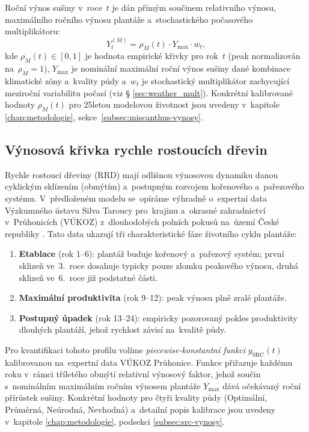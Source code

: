 Roční výnos sušiny v~roce~$t$ je dán přímým součinem relativního
výnosu, maximálního ročního výnosu plantáže a~stochastického
počasového multiplikátoru:
\begin{equation}
    Y_{t}^{(M)} = \rho_M(t) \cdot Y_{\max} \cdot w_t,
    \label{eq:miscanthus-vynos-empirie}
\end{equation}
kde $\rho_M(t) \in [0, 1]$ je hodnota empirické křivky pro rok~$t$
(peak normalizován na~$\rho_M = 1$), $Y_{\max}$ je nominální maximální
roční výnos sušiny dané kombinace klimatické zóny a~kvality půdy
a~$w_t$ je stochastický multiplikátor zachycující meziroční variabilitu
počasí (viz § \ref{sec:weather_mult}). Konkrétní kalibrované hodnoty
$\rho_M(t)$ pro 25letou modelovou životnost jsou uvedeny v~kapitole
\ref{chap:metodologie}, sekce~\ref{subsec:miscanthus-vynosy}.

\subsection{Výnosová křivka rychle rostoucích dřevin}
\label{subsec:src-yield}

Rychle rostoucí dřeviny (RRD) mají odlišnou výnosovou dynamiku
danou cyklickým sklízením (obmýtím) a~postupným rozvojem
kořenového a~pařezového systému. V~předloženém modelu se~opíráme
výhradně o~expertní data Výzkumného ústavu Silva Taroucy
pro~krajinu a~okrasné zahradnictví v~Průhonicích (VÚKOZ)
z~dlouhodobých polních pokusů na~území České republiky
\citep{VUKOZ2026}. Tato data ukazují tři charakteristické fáze
životního cyklu plantáže:
\begin{enumerate}
    \item \textbf{Etablace} (rok 1--6): plantáž buduje kořenový a~pařezový
          systém; první sklizeň ve~3.~roce dosahuje typicky pouze zlomku
          peakového výnosu, druhá sklizeň ve~6.~roce již podstatné části.
    \item \textbf{Maximální produktivita} (rok 9--12): peak výnosu
          plně zralé plantáže.
    \item \textbf{Postupný úpadek} (rok 13--24): empiricky pozorovaný
          pokles produktivity dlouhých plantáží, jehož rychlost závisí
          na~kvalitě půdy.
\end{enumerate}
Pro kvantifikaci tohoto profilu volíme \emph{piecewise-konstantní funkci}
$y_{\text{SRC}}(t)$ kalibrovanou na~expertní data VÚKOZ Průhonice.
Funkce přiřazuje každému roku v~rámci tříletého obmýtí relativní
výnosový faktor, jehož součin s~nominálním maximálním ročním výnosem
plantáže $Y_{\max}$ dává očekávaný roční přírůstek sušiny. Konkrétní
hodnoty pro čtyři kvality půdy (Optimální, Průměrná, Neúrodná,
Nevhodná) a~detailní popis kalibrace jsou uvedeny v~kapitole
\ref{chap:metodologie}, podsekci \ref{subsec:src-vynosy}.

